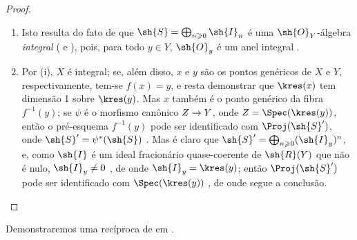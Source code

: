 \documentclass[oneside,10pt]{amsart}
\makeatletter
\renewcommand{\geq}{\geqslant}
\newcommand{\ega@arrow}[2]{\mathchoice{#1}{#2}{#2}{#2}}
\renewcommand{\to}{\ega@arrow{\longrightarrow}{\rightarrow}}
\makeatother
\begin{document}
\begin{proof}
\medskip\noindent
\begin{enumerate}
    \item[\rm{(i)}] Isto resulta do fato de que $\sh{S}=\bigoplus_{n\geq0}\sh{I}_n$ é uma $\sh{O}_Y$-álgebra \emph{integral} ( e ), pois, para todo $y\in Y$, $\sh{O}_y$ é um anel integral .
    \item[\rm{(ii)}] Por (i), $X$ é integral; se, além disso, $x$ e $y$ são os pontos genéricos de $X$ e $Y$, respectivamente, tem-se $f(x)=y$, e resta demonstrar que $\kres(x)$ tem dimensão 1 sobre $\kres(y)$.
        Mas $x$ também é o ponto genérico da fibra $f^{-1}(y)$; se $\psi$ é o morfismo canônico $Z\to Y$, onde $Z=\Spec(\kres(y))$, então o pré-esquema $f^{-1}(y)$ pode ser identificado com $\Proj(\sh{S}')$, onde $\sh{S}'=\psi^*(\sh{S})$ .
        Mas é claro que $\sh{S}'=\bigoplus_{n\geq0}(\sh{I}_y)^n$, e, como $\sh{I}$ é um ideal fracionário quase-coerente de $\sh{R}(Y)$ que não é nulo, $\sh{I}_y\neq0$ , de onde $\sh{I}_y=\kres(y)$;
        então $\Proj(\sh{S}')$ pode ser identificado com $\Spec(\kres(y))$ , de onde segue a conclusão.
\end{enumerate}
\end{proof}

Demonstraremos uma recíproca de  em .
\end{document}
